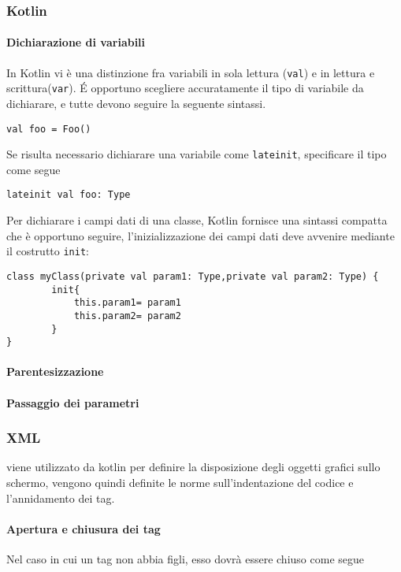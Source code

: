 \subsubsection{Kotlin}

\paragraph{Dichiarazione di variabili}
In Kotlin vi è una distinzione fra variabili in sola lettura (\texttt{val}) e in lettura e scrittura(\texttt{var}). \'E opportuno scegliere accuratamente il tipo di variabile da dichiarare, e tutte devono seguire la seguente sintassi.

\begin{lstlisting}
val foo = Foo() 						
\end{lstlisting}

Se risulta necessario dichiarare una variabile come \texttt{lateinit}, specificare il tipo come segue
\begin{lstlisting}
lateinit val foo: Type							
\end{lstlisting}

Per dichiarare i campi dati di una classe, Kotlin fornisce una sintassi compatta che è opportuno seguire, l'inizializzazione dei campi dati deve avvenire mediante il costrutto \texttt{init}:

\begin{lstlisting}
class myClass(private val param1: Type,private val param2: Type) {	
		init{
			this.param1= param1
			this.param2= param2	
		} 
}
\end{lstlisting}


\paragraph{Parentesizzazione}

\paragraph{Passaggio dei parametri}

\subsubsection{XML}
 viene utilizzato da kotlin per definire la disposizione degli oggetti grafici sullo schermo, vengono quindi definite le norme sull'indentazione del codice e l'annidamento dei tag.

\paragraph{Apertura e chiusura dei tag}
Nel caso in cui un tag non abbia figli, esso dovrà essere chiuso come segue


